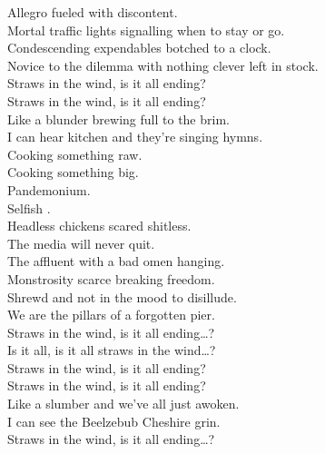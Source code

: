 Allegro fueled with discontent. \\
Mortal traffic lights signalling when to stay or go. \\
Condescending expendables botched to a clock. \\
Novice to the dilemma with nothing clever left in stock. \\

Straws in the wind, is it all ending? \\
Straws in the wind, is it all ending? \\
Like a blunder brewing full to the brim. \\
I can hear  kitchen and they're singing hymns. \\

Cooking something raw. \\
Cooking something big. \\
Pandemonium. \\
Selfish . \\
Headless chickens scared shitless. \\
The media will never quit. \\

The affluent with a bad omen hanging. \\
Monstrosity scarce breaking freedom. \\
Shrewd and not in the mood to disillude. \\
We are the pillars of a forgotten pier. \\

Straws in the wind, is it all ending…? \\

Is it all, is it all straws in the wind…? \\

Straws in the wind, is it all ending? \\
Straws in the wind, is it all ending? \\
Like a slumber and we've all just awoken. \\
I can see the Beelzebub Cheshire grin. \\

Straws in the wind, is it all ending…? \\






